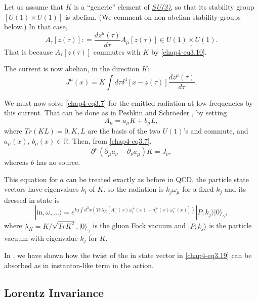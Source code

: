 Let us assume that $K$ is a ``generic'' element of \ul{\textit{SU(3)}}, so that its stability group $[U(1) \times U (1)]$ is abelian. (We comment on non-abelian stability groups below.) In that case,
\begin{equation}
A_\tau [z(\tau)]: = \frac{dz^\mu(\tau)}{d\tau} A_\mu [z(\tau)] \in \underline{U(1) \times U(1)}.\label{chap4-eq3.15}
\end{equation}
That is because $A_\tau [z(\tau)]$ commutes with $K$ by \eqref{chap4-eq3.10}.

The current is now abelian, in the direction $K$:
\begin{equation}
J^\mu (x) = K \int d \tau \delta^4 [x-z(\tau)] \frac{dz^\mu(\tau)}{d\tau}. \label{chap4-eq3.16}
\end{equation}

We must now solve \eqref{chap4-eq3.7} for the emitted radiation at low frequencies by this current. That can be done as in Peshkin and Schr\"oeder \cite{chap4-key8}, by setting
\begin{equation}
A_\mu = a_\mu K + b_\mu L, \label{chap4-eq3.17}
\end{equation}
where $Tr (KL)=0, K, L$ are the basis of the two \ul{$U(1)$}'s and commute, and $a_\mu(x)$, $b_\mu(x)\in \mathbb{R}$. Then, from \eqref{chap4-eq3.7},
\begin{equation}
\partial^\mu (\partial_\mu a_{\nu} - \partial_\nu a_\mu) K = J_{\nu}, \label{chap4-eq3.18}
\end{equation}
whereas $b$ has no source.

This equation for $a$ can be treated exactly as before in QCD. the particle state vectors have eigenvalues $k_i$ of $K$. so the radiation is $k_j \omega_\mu$ for a fixed $k_j$ and its dressed in state is
\begin{equation}
|\text{in}, \omega, \ldots \rangle = e^{kj \int d^3 x (Tr\lambda_K[A_i^- (x) \omega_i^+ (x)- a_i^+ (x) \omega_i^-(x)])} | P; k_j \rangle |0\rangle_\gamma, \label{chap4-eq3.19} 
\end{equation}
where $\lambda_K = K / \sqrt{TrK^2}, |0\rangle_\gamma$ is the gluon Fock vacuum and $|P; k_j \rangle$ is the particle vacuum with eigenvalue $k_j$ for $K$.

In \cite{chap4-key4}, we have shown how the twist of the in state vector in \eqref{chap4-eq3.19} can be absorbed as in instanton-like term in the action.

\subsection{Lorentz Invariance}\label{chap4-sec3.2}

